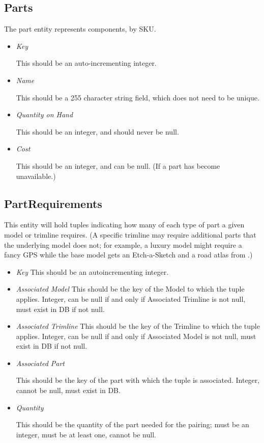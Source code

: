 \documentclass[11pt,letterpaper,oneside]{amsart}
\begin{document}
\subsection*{Parts}

The part entity represents components, by SKU.

\begin{itemize}

\item \emph{Key}

	This should be an auto-incrementing integer.
	
\item \emph{Name}

	This should be a 255 character string field, which does not need to be unique.
	
\item \emph{Quantity on Hand}

	This should be an integer, and should never be null.
	
\item \emph{Cost}

	This should be an integer, and can be null. (If a part has become unavailable.)
	
\end{itemize}

\subsection*{PartRequirements}

This entity will hold tuples indicating how many of each type of part a given model or trimline requires.  (A specific trimline may require additional parts that the underlying model does not; for example, a luxury model might require a fancy GPS while the base model gets an Etch-a-Sketch and a road atlas from .)

\begin{itemize}

\item \emph{Key}
	This should be an autoincrementing integer.
	
\item \emph{Associated Model}
	This should be the key of the Model to which the tuple applies.  Integer, can be null if and only if Associated Trimline is not null, must exist in DB if not null.
	
\item \emph{Associated Trimline}
	This should be the key of the Trimline to which the tuple applies.  Integer, can be null if and only if Associated Model is not null, must exist in DB if not null.
	
\item \emph{Associated Part}

	This should be the key of the part with which the tuple is associated.  Integer, cannot be null, must exist in DB.
	
\item \emph{Quantity}

	This should be the quantity of the part needed for the pairing; must be an integer, must be at least one, cannot be null.
	
\end{itemize}
\end{document}
